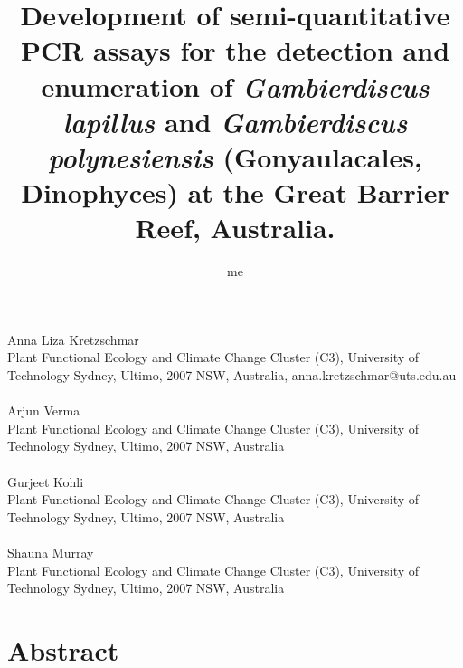 \documentclass[12pt]{article}
\title{Development of semi-quantitative PCR assays for the detection and enumeration of \emph{Gambierdiscus lapillus} and \emph{Gambierdiscus polynesiensis} (Gonyaulacales, Dinophyces) at the Great Barrier Reef, Australia.}
\author{me}
\date{}
\begin{document}
\maketitle
\paragraph{}Anna Liza Kretzschmar\\
Plant Functional Ecology and Climate Change Cluster (C3), University of Technology Sydney, Ultimo, 2007 NSW, Australia, anna.kretzschmar@uts.edu.au
\paragraph{}Arjun Verma \\
Plant Functional Ecology and Climate Change Cluster (C3), University of Technology Sydney, Ultimo, 2007 NSW, Australia
\paragraph{}Gurjeet Kohli\\
Plant Functional Ecology and Climate Change Cluster (C3), University of Technology Sydney, Ultimo, 2007 NSW, Australia
\paragraph{}Shauna Murray\\
Plant Functional Ecology and Climate Change Cluster (C3), University of Technology Sydney, Ultimo, 2007 NSW, Australia
\newpage
\section{Abstract}
\newpage
\end{document}
